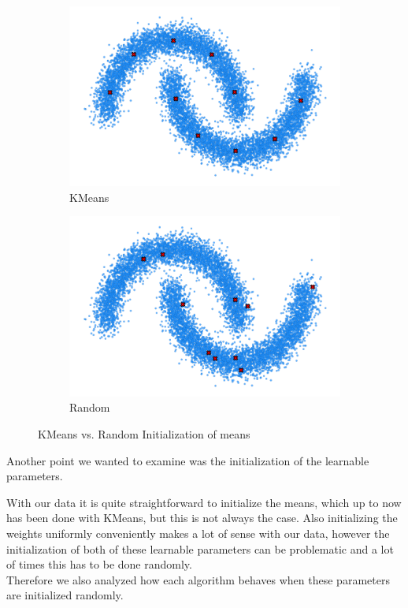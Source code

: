 \begin{figure}[H]
    \centering
    \begin{subfigure}[b]{0.49\textwidth} 
        \centering
        \includegraphics[width=\textwidth]{figures/halfmoons/10_kmeans_data.png}
        \caption{KMeans}
    \end{subfigure}
    \begin{subfigure}[b]{0.49\textwidth} 
        \centering
        \includegraphics[width=\textwidth]{figures/halfmoons/10_random1_data.png} 
        \caption{Random}
    \end{subfigure} 
    \caption{KMeans vs. Random Initialization of means}
    \label{fig:kmeans_vs_rand}
\end{figure}

Another point we wanted to examine was the initialization of the learnable parameters. 

With our data it is quite straightforward to initialize the means, which up to now has been done with KMeans, but this is not always the case.
Also initializing the weights uniformly conveniently makes a lot of sense with our data, however the initialization of both of these 
learnable parameters can be problematic and a lot of times this has to be done randomly. \\
Therefore we also analyzed how each algorithm 
behaves when these parameters are initialized randomly. 

